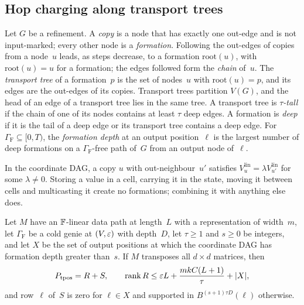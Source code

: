 \subsection{Hop charging along transport trees}\label{sec:hop-HC}

\begin{definition}\label{def:transport}
Let $G$ be a refinement. A \emph{copy} is a node that has exactly one out-edge and is not input-marked; every other node
is a \emph{formation}. Following the out-edges of copies from a node~$u$ leads, as steps decrease, to a formation
$\mathrm{root}(u)$, with $\mathrm{root}(u)=u$ for a formation; the edges followed form the \emph{chain} of~$u$. The
\emph{transport tree} of a formation~$p$ is the set of nodes~$u$ with $\mathrm{root}(u)=p$, and its edges are the
out-edges of its copies. Transport trees partition $V(G)$, and the head of an edge of a transport tree lies in the same
tree. A transport tree is \emph{$\tau$-tall} if the chain of one of its nodes contains at least $\tau$ deep edges. A
formation is \emph{deep} if it is the tail of a deep edge or its transport tree contains a deep edge. For
$\Gamma_{\mathrm F}\subseteq[0,T)$, the \emph{formation depth} at an output position~$\ell$ is the largest number of
deep formations on a $\Gamma_{\mathrm F}$-free path of~$G$ from an output node of~$\ell$.
\end{definition}

In the coordinate DAG, a copy $u$ with out-neighbour~$u'$ satisfies $V^{\mathrm{lin}}_u=\lambda V^{\mathrm{lin}}_{u'}$
for some $\lambda\ne0$. Storing a value in a cell, carrying it in the state, moving it between cells and multicasting it
create no formations; combining it with anything else does.

\begin{theorem}\label{thm:HC}
Let $M$ have an $\mathbb{F}$-linear data path at length~$L$ with a representation of width~$m$, let $\Gamma_{\mathrm F}$ be a
cold genie at $(V,\varepsilon)$ with depth~$D$, let $\tau\ge1$ and $s\ge0$ be integers, and let $X$ be the set of output
positions at which the coordinate DAG has formation depth greater than~$s$. If $M$ transposes all $d\times d$ matrices,
then
\[
  P_{\operatorname{tpos}}=R+S,\qquad\operatorname{rank} R\le\varepsilon L+\frac{mkC(L+1)}{\tau}+\lvert X \rvert,
\]
and row~$\ell$ of~$S$ is zero for $\ell\in X$ and supported in $B^{(s+1)\tau D}(\ell)$ otherwise.
\end{theorem}

